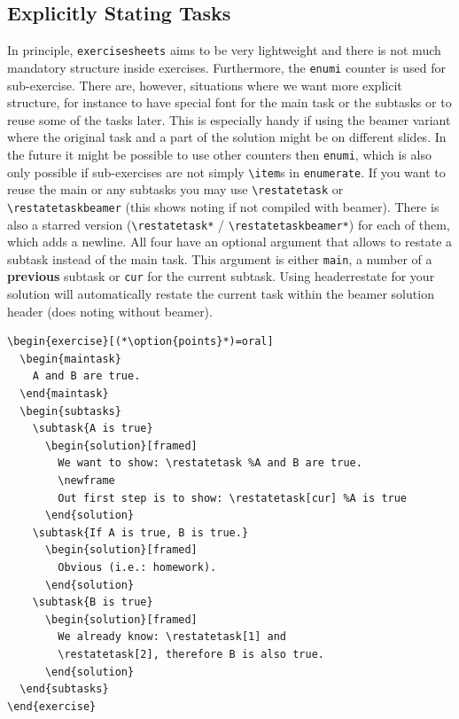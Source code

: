 \documentclass[DIV12,BCOR0mm]{scrartcl}
\newcommand{\exsh}{\texttt{exercisesheets}\xspace}
\newcommand{\optionstyle}{\normalfont\ttfamily\color{red!50!black}}
\newcommand{\option}[1]{{\optionstyle #1}}
\begin{document}
\subsection{Explicitly Stating Tasks}
In principle, \exsh aims to be very lightweight and there is not
much mandatory structure inside exercises. Furthermore, the
\lstinline|enumi| counter is used for sub-exercise. There are, however,
situations where we want more explicit structure, for instance to
have special font for the main task or the subtasks or to reuse
some of the tasks later. This is especially handy if using the
beamer variant where the original task and a part of the solution might be on different slides. In the future it might be possible to
use other counters then \lstinline|enumi|, which is also only possible
if sub-exercises are not simply \lstinline|\item|s in
\lstinline|enumerate|. If you want to reuse the main or any subtasks
you may use \lstinline|\restatetask| or \lstinline|\restatetaskbeamer|
(this shows noting if not compiled with beamer). There is also
a starred version (\lstinline|\restatetask*| /
\lstinline|\restatetaskbeamer*|) for each of them, which adds a newline.
All four have an optional argument that allows to restate
a subtask instead of the main task. This argument is either
\lstinline|main|, a number of a \textbf{previous} subtask or
\lstinline|cur| for the current subtask. Using \option{headerrestate}
for your solution will automatically restate the current
task within the beamer solution header (does noting without
beamer).



\begin{lstlisting}
\begin{exercise}[(*\option{points}*)=oral]
  \begin{maintask}
    A and B are true.
  \end{maintask}
  \begin{subtasks}
    \subtask{A is true}
      \begin{solution}[framed]
        We want to show: \restatetask %A and B are true.
        \newframe
        Out first step is to show: \restatetask[cur] %A is true
      \end{solution}
    \subtask{If A is true, B is true.}
      \begin{solution}[framed]
        Obvious (i.e.: homework).
      \end{solution}
    \subtask{B is true}
      \begin{solution}[framed]
        We already know: \restatetask[1] and
        \restatetask[2], therefore B is also true.
      \end{solution}
  \end{subtasks}
\end{exercise}
\end{lstlisting}
\end{document}
